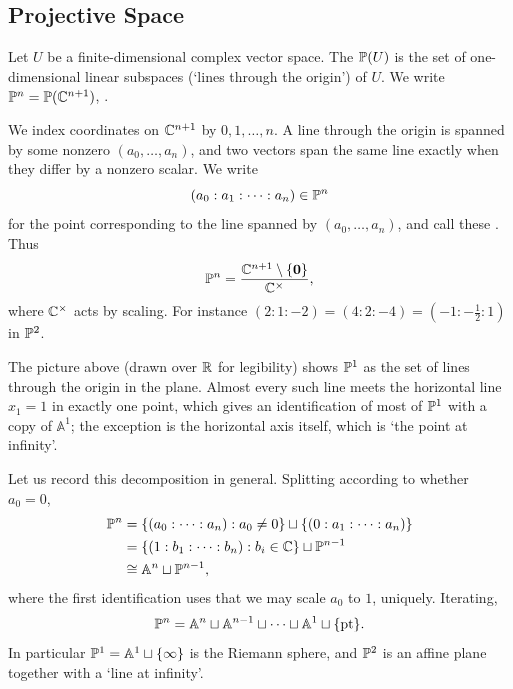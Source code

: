 \documentclass[a4paper]{scrartcl}
\newcommand{\A}{\mathbb{A}}
\begin{document}
\subsection{Projective Space}

\begin{definition}[Projectivisation]
	Let $U$ be a finite-dimensional complex vector space. The  $\mathbb{P}(U)$ is the set of one-dimensional linear subspaces (`lines through the origin') of $U$. We write $\mathbb{P}^n = \mathbb{P}(\mathbb{C}^{n+1})$, .
\end{definition}

We index coordinates on $\mathbb{C}^{n+1}$ by $0,1,\dots,n$. A line through the origin is spanned by some nonzero $(a_0,\dots,a_n)$, and two vectors span the same line exactly when they differ by a nonzero scalar. We write
$$(a_0 : a_1 : \cdots : a_n) \in \mathbb{P}^n$$
for the point corresponding to the line spanned by $(a_0,\dots,a_n)$, and call these . Thus
$$\mathbb{P}^n = \frac{\mathbb{C}^{n+1}\setminus\{\mathbf{0}\}}{\mathbb{C}^\times},$$
where $\mathbb{C}^\times$ acts by scaling. For instance $(2:1:-2) = (4:2:-4) = (-1:-\tfrac12:1)$ in $\mathbb{P}^2$.

\begin{center}
\end{center}

The picture above (drawn over $\mathbb{R}$ for legibility) shows $\mathbb{P}^1$ as the set of lines through the origin in the plane. Almost every such line meets the horizontal line $x_1 = 1$ in exactly one point, which gives an identification of most of $\mathbb{P}^1$ with a copy of $\A^1$; the exception is the horizontal axis itself, which is `the point at infinity'.

Let us record this decomposition in general. Splitting according to whether $a_0 = 0$,
\begin{align*}
	\PP^n &= \{(a_0 : \cdots : a_n) : a_0 \neq 0\} \sqcup \{(0 : a_1 : \cdots : a_n)\}\\
	&= \{(1 : b_1 : \cdots : b_n) : b_i \in \C\} \sqcup \PP^{n-1}\\
	&\cong \A^n \sqcup \PP^{n-1},
\end{align*}
where the first identification uses that we may scale $a_0$ to $1$, uniquely. Iterating,
$$\PP^n = \A^n \sqcup \A^{n-1} \sqcup \cdots \sqcup \A^1 \sqcup \{\text{pt}\}.$$
In particular $\PP^1 = \A^1 \sqcup \{\infty\}$ is the Riemann sphere, and $\mathbb{P}^2$ is an affine plane together with a `line at infinity'.
\end{document}
